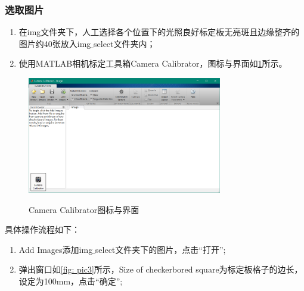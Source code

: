 \subsubsection{选取图片}
\begin{enumerate}[$\star$]%
\item 在img文件夹下，人工选择各个位置下的光照良好标定板无亮斑且边缘整齐的图片约40张放入img$\_$select文件夹内；
\item 使用MATLAB相机标定工具箱Camera Calibrator，图标与界面如\figurename\ref{fig: caca}所示。
\end{enumerate}

\begin{figure}[htbp]
	\centering
    \includegraphics[width=8.5cm]{pic/2.png} \\
	\caption{Camera Calibrator图标与界面}\label{fig: caca}
\end{figure}

具体操作流程如下：
\begin{enumerate}[\indent $1)$]
\item Add Images添加img$\_$select文件夹下的图片，点击“打开”;
\item 弹出窗口如\figurename\ref{fig: pic3}所示，Size of checkerbored square为标定板格子的边长，设定为100mm，点击“确定”;
\end{enumerate}

